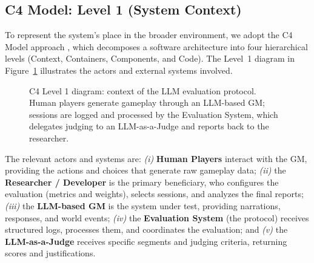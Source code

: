 \documentclass[12pt]{article}
\begin{document}
\subsection{C4 Model: Level 1 (System Context)}

To represent the system's place in the broader environment, we adopt the C4 Model approach \cite{brown:2024}, which decomposes a software architecture into four hierarchical levels (Context, Containers, Components, and Code). The Level~1 diagram in Figure~\ref{fig:c4-context} illustrates the actors and external systems involved.

\begin{figure}[ht]
\centering
{}
\caption{C4 Level 1 diagram: context of the LLM evaluation protocol. Human players generate gameplay through an LLM-based GM; sessions are logged and processed by the Evaluation System, which delegates judging to an LLM-as-a-Judge and reports back to the researcher.}
\label{fig:c4-context}
\end{figure}

The relevant actors and systems are: \textit{(i)} \textbf{Human Players} interact with the GM, providing the actions and choices that generate raw gameplay data; \textit{(ii)} the \textbf{Researcher / Developer} is the primary beneficiary, who configures the evaluation (metrics and weights), selects sessions, and analyzes the final reports; \textit{(iii)} the \textbf{LLM-based GM} is the system under test, providing narrations, responses, and world events; \textit{(iv)} the \textbf{Evaluation System} (the protocol) receives structured logs, processes them, and coordinates the evaluation; and \textit{(v)} the \textbf{LLM-as-a-Judge} receives specific segments and judging criteria, returning scores and justifications.
\end{document}
